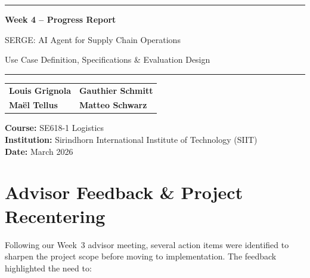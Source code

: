 \documentclass[11pt,a4paper]{article}
\begin{document}
\begin{titlepage}
\centering
\vspace*{3cm}

{\color{MidnightBlue}\rule{\linewidth}{1.2pt}}

\vspace{1.5cm}
{\Huge\bfseries\color{MidnightBlue} Week 4 -- Progress Report}

\vspace{0.8cm}
{\LARGE SERGE: AI Agent for Supply Chain Operations}

\vspace{0.5cm}
{\large\color{gray} Use Case Definition, Specifications \& Evaluation Design}

\vspace{1.5cm}
{\color{MidnightBlue}\rule{\linewidth}{1.2pt}}

\vspace{2cm}

{\large
\begin{tabular}{ll}
\textbf{Louis Grignola} & \textbf{Gauthier Schmitt} \\[0.3em]
\textbf{Ma\"el Tellus}    & \textbf{Matteo Schwarz}   \\
\end{tabular}
}

\vspace{2cm}

{\large
\textbf{Course:} SE618-1 Logistics\\[0.4em]
\textbf{Institution:} Sirindhorn International Institute of Technology (SIIT)\\[0.4em]
\textbf{Date:} March 2026
}

\vfill
\end{titlepage}

\newpage
\tableofcontents
\newpage

\section{Advisor Feedback \& Project Recentering}

Following our Week~3 advisor meeting, several action items were identified to sharpen the project scope before moving to implementation. The feedback highlighted the need to:
\end{document}
